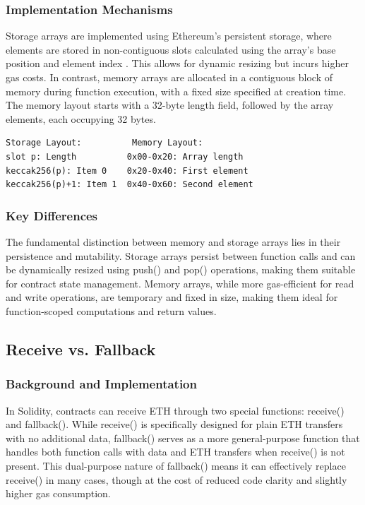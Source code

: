 \documentclass[conference]{IEEEtran}
\begin{document}
\subsubsection{Implementation Mechanisms}
Storage arrays are implemented using Ethereum's persistent storage, where elements are stored in non-contiguous slots calculated using the array's base position and element index \cite{solidityStorage}. This allows for dynamic resizing but incurs higher gas costs. In contrast, memory arrays are allocated in a contiguous block of memory during function execution, with a fixed size specified at creation time. The memory layout starts with a 32-byte length field, followed by the array elements, each occupying 32 bytes.

{\small
\begin{verbatim}
Storage Layout:          Memory Layout:
slot p: Length          0x00-0x20: Array length
keccak256(p): Item 0    0x20-0x40: First element
keccak256(p)+1: Item 1  0x40-0x60: Second element
\end{verbatim}
}

\subsubsection{Key Differences}
The fundamental distinction between memory and storage arrays lies in their persistence and mutability. Storage arrays persist between function calls and can be dynamically resized using push() and pop() operations, making them suitable for contract state management. Memory arrays, while more gas-efficient for read and write operations, are temporary and fixed in size, making them ideal for function-scoped computations and return values.

\vspace{1em}
\subsection{Receive vs. Fallback}

\subsubsection{Background and Implementation}
In Solidity, contracts can receive ETH through two special functions: receive() and fallback(). While receive() is specifically designed for plain ETH transfers with no additional data, fallback() serves as a more general-purpose function that handles both function calls with data and ETH transfers when receive() is not present. This dual-purpose nature of fallback() means it can effectively replace receive() in many cases, though at the cost of reduced code clarity and slightly higher gas consumption.
\end{document}
